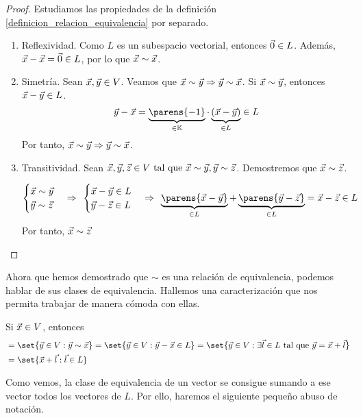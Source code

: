 \documentclass[../algebra_lineal.tex]{subfiles}
\begin{document}
\begin{proof}
    Estudiamos las propiedades de la definición \ref{definicion_relacion_equivalencia} por separado.
    \begin{enumerate}[]
        \item Reflexividad. Como $L$ es un subespacio vectorial, entonces $\vec{0} \in L$. Además, $\vec{x} - \vec{x} = \vec{0} \in L$, por lo que $\vec{x} \sim \vec{x}$.
        \item Simetría. Sean $\vec{x}, \vec{y} \in V$. Veamos que $\vec{x} \sim \vec{y} \Rightarrow \vec{y} \sim \vec{x}$. Si $\vec{x} \sim \vec{y}$, entonces $\vec{x} - \vec{y} \in L$.
        \[
            \vy - \vx = \underbrace{\parens{-1}}_{\in \K}\cdot \underbrace{(\vx - \vy)}_{\in L} \in L
        \]
        Por tanto, $\vec{x} \sim \vec{y} \Rightarrow \vec{y} \sim \vec{x}$.
        \item Transitividad. Sean $\vec{x}, \vec{y}, \vec{z} \in V \mathrm{\,\, tal \,\, que \,\,} \vec{x} \sim \vec{y}, \vec{y} \sim \vec{z}$. Demostremos que $\vec{x} \sim \vec{z}$.
        
        \[
        \begin{cases}
            \vx \sim \vy \\
            \vy \sim \vz 
        \end{cases} \Rightarrow \spc
        \begin{cases}
            \vx - \vy \in L \\
            \vy - \vz \in L
        \end{cases} \Rightarrow \spc
        \underbrace{\parens{\vx - \vy}}_{\in L} + \underbrace{\parens{\vy - \vz}}_{\in L} = \vx - \vz \in L 
        \]
        Por tanto, $\vec{x} \sim \vec{z}$
    \end{enumerate}
\end{proof}

Ahora que hemos demostrado que $\sim$ es una relación de equivalencia, podemos hablar de sus clases de equivalencia. Hallemos una caracterización que nos permita trabajar de manera cómoda con ellas. 

\begin{remark}
    Si $\vec{x} \in V$, entonces
    \begin{align*}
        [\vx] &= \set{\vy \in V : \vy \sim \vx} = \set{\vy \in V : \vy - \vx \in L} = \set{\vy \in V : \exists \vec{l} \in L \st \vy = \vx + \vec{l}} \\
              &= \set{\vx + \vec{l} : \vec{l} \in L}
    \end{align*}
\end{remark}

Como vemos, la clase de equivalencia de un vector se consigue sumando a ese vector todos los vectores de $L$. Por ello, haremos el siguiente pequeño abuso de notación.
\end{document}
